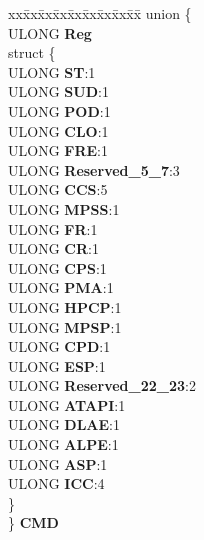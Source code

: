 \begin{DoxyCompactItemize}
\begin{tabbing}
\end{tabbing}\item 
\mbox{\label{struct___i_d_e___a_h_c_i___p_o_r_t___r_e_g_i_s_t_e_r_s_a296b0d4aa06b229e5291d9592dd576a9}} 
\begin{tabbing}
xx\=xx\=xx\=xx\=xx\=xx\=xx\=xx\=xx\=\kill
union \{\\
\>ULONG {\bfseries Reg}\\
\mbox{\label{union___i_d_e___a_h_c_i___p_o_r_t___r_e_g_i_s_t_e_r_s_1_1_0D1018_a161b598dd1818480b89a47099942de78}} 
\>struct \{\\
\>\>ULONG {\bfseries ST}:1\\
\>\>ULONG {\bfseries SUD}:1\\
\>\>ULONG {\bfseries POD}:1\\
\>\>ULONG {\bfseries CLO}:1\\
\>\>ULONG {\bfseries FRE}:1\\
\>\>ULONG {\bfseries Reserved\_5\_7}:3\\
\>\>ULONG {\bfseries CCS}:5\\
\>\>ULONG {\bfseries MPSS}:1\\
\>\>ULONG {\bfseries FR}:1\\
\>\>ULONG {\bfseries CR}:1\\
\>\>ULONG {\bfseries CPS}:1\\
\>\>ULONG {\bfseries PMA}:1\\
\>\>ULONG {\bfseries HPCP}:1\\
\>\>ULONG {\bfseries MPSP}:1\\
\>\>ULONG {\bfseries CPD}:1\\
\>\>ULONG {\bfseries ESP}:1\\
\>\>ULONG {\bfseries Reserved\_22\_23}:2\\
\>\>ULONG {\bfseries ATAPI}:1\\
\>\>ULONG {\bfseries DLAE}:1\\
\>\>ULONG {\bfseries ALPE}:1\\
\>\>ULONG {\bfseries ASP}:1\\
\>\>ULONG {\bfseries ICC}:4\\
\>\} \\
\} {\bfseries CMD}\\


\end{tabbing}
\end{DoxyCompactItemize}
